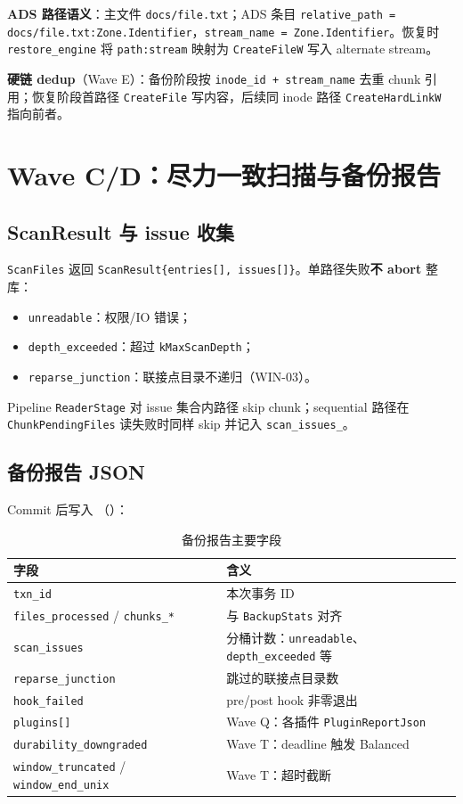\textbf{ADS 路径语义}：主文件 \texttt{docs/file.txt}；ADS 条目 \texttt{relative\_path = docs/file.txt:Zone.Identifier}，\texttt{stream\_name = Zone.Identifier}。恢复时 \texttt{restore\_engine} 将 \texttt{path:stream} 映射为 \texttt{CreateFileW} 写入 alternate stream。

\textbf{硬链 dedup}（Wave E）：备份阶段按 \texttt{inode\_id + stream\_name} 去重 chunk 引用；恢复阶段首路径 \texttt{CreateFile} 写内容，后续同 inode 路径 \texttt{CreateHardLinkW} 指向前者。

\section{Wave C/D：尽力一致扫描与备份报告}
\label{sec:cap-scan-report}

\subsection{ScanResult 与 issue 收集}

\texttt{ScanFiles} 返回 \texttt{ScanResult\{entries[], issues[]\}}。单路径失败\textbf{不 abort} 整库：
\begin{itemize}[nosep]
  \item \texttt{unreadable}：权限/IO 错误；
  \item \texttt{depth\_exceeded}：超过 \texttt{kMaxScanDepth}；
  \item \texttt{reparse\_junction}：联接点目录不递归（WIN-03）。
\end{itemize}

Pipeline \texttt{ReaderStage} 对 issue 集合内路径 skip chunk；sequential 路径在 \texttt{ChunkPendingFiles} 读失败时同样 skip 并记入 \texttt{scan\_issues\_}。

\subsection{备份报告 JSON}

Commit 后写入 （）：

\begin{longtable}{@{}lp{9cm}@{}}
\caption{备份报告主要字段} \\
\toprule
字段 & 含义 \\
\midrule
\texttt{txn\_id} & 本次事务 ID \\
\texttt{files\_processed} / \texttt{chunks\_*} & 与 \texttt{BackupStats} 对齐 \\
\texttt{scan\_issues} & 分桶计数：\texttt{unreadable}、\texttt{depth\_exceeded} 等 \\
\texttt{reparse\_junction} & 跳过的联接点目录数 \\
\texttt{hook\_failed} & pre/post hook 非零退出 \\
\texttt{plugins[]} & Wave Q：各插件 \texttt{PluginReportJson} \\
\texttt{durability\_downgraded} & Wave T：deadline 触发 Balanced \\
\texttt{window\_truncated} / \texttt{window\_end\_unix} & Wave T：超时截断 \\
\bottomrule
\end{longtable}

